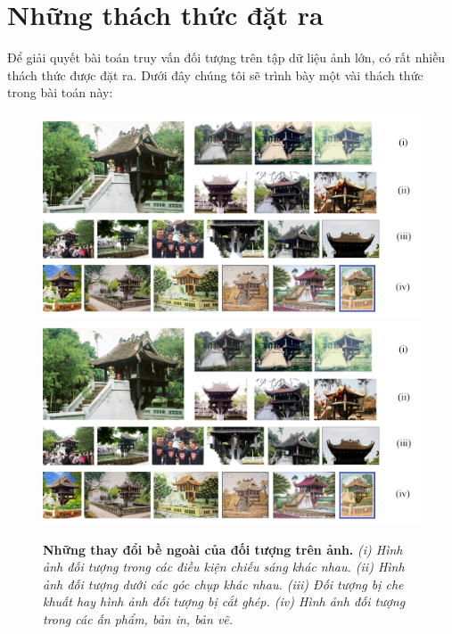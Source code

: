 \section{Những thách thức đặt ra}
 Để giải quyết bài toán truy vấn đối tượng trên tập dữ liệu ảnh lớn, có rất nhiều thách thức được đặt ra. Dưới đây chúng tôi sẽ trình bày một vài thách thức trong bài toán này:\\
 \begin{figure}[!htbp]
  \begin{center}
    \leavevmode
    \ifpdf
      \includegraphics[scale=0.20]{chuaMotCot}
    \else
      \includegraphics[scale=0.20]{chuaMotCot}
    \fi
    \caption[Những thay đổi bề ngoài của đối tượng trên ảnh]{\textbf{Những thay đổi bề ngoài của đối tượng trên ảnh.} \textit{(i) Hình ảnh đối tượng trong các điều kiện chiếu sáng khác nhau. (ii) Hình ảnh đối tượng dưới các góc chụp khác nhau. (iii) Đối tượng bị che khuất hay hình ảnh đối tượng bị cắt ghép. (iv) Hình ảnh đối tượng trong các ấn phẩm, bản in, bản vẽ.}}
    \label{FigTemple}
  \end{center}
\end{figure} 
